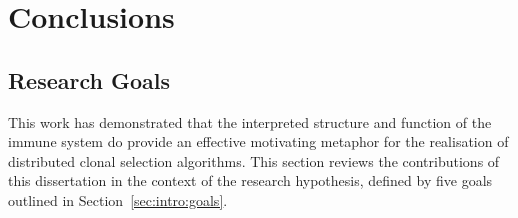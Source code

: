 
%
%



%
%
\chapter{Conclusions}
\label{chap:conclusions}


%
%
%
\section{Research Goals}
\label{sec:conclusion:goals}
This work has demonstrated that the interpreted structure and function of the immune system do provide an effective motivating metaphor for the realisation of distributed clonal selection algorithms.
This section reviews the contributions of this dissertation in the context of the research hypothesis, defined by five goals outlined in Section~\ref{sec:intro:goals}.

